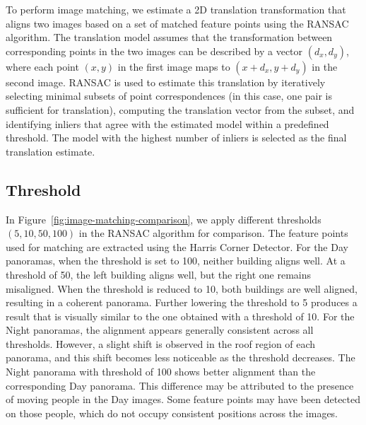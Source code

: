 To perform image matching, we estimate a 2D translation transformation that aligns 
two images based on a set of matched feature points using the RANSAC algorithm. 
The translation model assumes that the transformation between corresponding points 
in the two images can be described by a vector $(d_x, d_y)$, where each point 
$(x, y)$ in the first image maps to $(x + d_x, y + d_y)$ in the second image. 
RANSAC is used to estimate this translation by iteratively selecting minimal 
subsets of point correspondences (in this case, one pair is sufficient for 
translation), computing the translation vector from the subset, and 
identifying inliers that agree with the estimated model within a predefined 
threshold. The model with the highest number of inliers is selected as the final 
translation estimate.

\subsection{Threshold}

In Figure~\ref{fig:image-matching-comparison}, we apply different thresholds 
$(5, 10, 50, 100)$ in the RANSAC algorithm for comparison. The feature points 
used for matching are extracted using the Harris Corner Detector. For the Day 
panoramas, when the threshold is set to 100, neither building aligns well. At 
a threshold of 50, the left building aligns well, but the right one remains 
misaligned. When the threshold is reduced to 10, both buildings are well aligned, 
resulting in a coherent panorama. Further lowering the threshold to 5 produces a 
result that is visually similar to the one obtained with a threshold of 10. 
For the Night panoramas, the alignment appears generally consistent across all 
thresholds. However, a slight shift is observed in the roof region of each 
panorama, and this shift becomes less noticeable as the threshold decreases.
The Night panorama with threshold of 100 shows better alignment than the 
corresponding Day panorama. This difference may be attributed to the presence 
of moving people in the Day images. Some feature points may have been detected 
on those people, which do not occupy consistent positions across the images.

